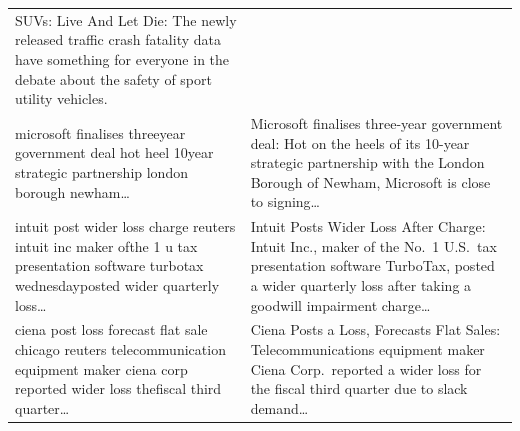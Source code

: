 \begin{table}[htbp]
\begin{tabular}{p{0.6\textheight} p{0.6\textheight}}
SUVs: Live And Let Die: The newly released traffic crash fatality data have something for everyone in the debate about the safety of sport utility vehicles. \\
\addlinespace
microsoft finalises threeyear government deal hot heel 10year strategic partnership london borough newham\ldots &
Microsoft finalises three-year government deal: Hot on the heels of its 10-year strategic partnership with the London Borough of Newham, Microsoft is close to signing\ldots \\
\addlinespace
intuit post wider loss charge reuters intuit inc maker ofthe 1 u tax presentation software turbotax wednesdayposted wider quarterly loss\ldots &
Intuit Posts Wider Loss After Charge: Intuit Inc., maker of the No.\ 1 U.S.\ tax presentation software TurboTax, posted a wider quarterly loss after taking a goodwill impairment charge\ldots \\
\addlinespace
ciena post loss forecast flat sale chicago reuters telecommunication equipment maker ciena corp reported wider loss thefiscal third quarter\ldots &
Ciena Posts a Loss, Forecasts Flat Sales: Telecommunications equipment maker Ciena Corp.\ reported a wider loss for the fiscal third quarter due to slack demand\ldots \\
\bottomrule
\end{tabular}
\end{table}

\newpage

